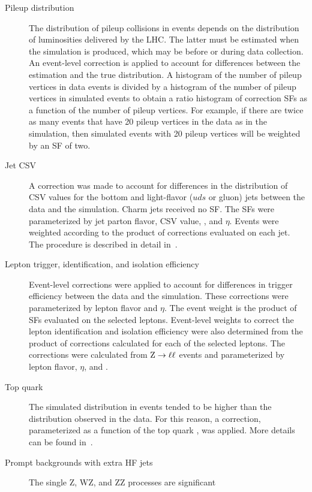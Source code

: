 \begin{description}
  \item[Pileup distribution] The distribution of pileup collisions in events
    depends on the distribution of luminosities delivered by the LHC. The latter must
    be estimated when the simulation is produced, which may be before or during
    data collection. An event-level correction is applied to account for differences
    between the estimation and the true distribution. A histogram of the number
    of pileup vertices in data events is divided by a histogram of the number of
    pileup vertices in simulated events to obtain a ratio histogram of
    correction SFs as a function of the number of pileup vertices. For example,
    if there are twice as many events that have 20 pileup vertices in the data
    as in the simulation, then simulated events with 20 pileup vertices will be
    weighted by an SF of two.
  \item[Jet CSV] A correction was made to account
    for differences in the distribution of CSV values for the bottom and
    light-flavor ($uds$ or gluon) jets between the data and the simulation.
    Charm jets received no SF. The SFs were parameterized by jet parton flavor,
    CSV value, \pT, and $\eta$. Events were weighted according to the product of
    corrections evaluated on each jet. The procedure is described in detail
    in~\cite{CMS-AN-2013-130}.
  \item[Lepton trigger, identification, and
    isolation efficiency] Event-level corrections were applied to account for
    differences in trigger efficiency between the data and the simulation. These
    corrections were
    parameterized by lepton flavor and $\eta$. The event weight is the product
    of SFs evaluated on the selected leptons. Event-level weights to correct the
    lepton identification and isolation efficiency were also determined from the
    product of corrections calculated for each of the selected leptons. The
    corrections were calculated from $\text{Z} \rightarrow \ell\ell$ events and
    parameterized by lepton flavor, $\eta$, and \pT.
  \item[Top quark \pT] The simulated \pT distribution in \ttbar events tended to
    be higher than the distribution observed in the data. For this reason, a correction,
    parameterized as a function of the top quark \pT, was applied. More details
    can be found in~\cite{Chatrchyan:2012saa}.
  \item[Prompt backgrounds with extra HF jets] The single Z, WZ, and ZZ
    processes are significant

\end{description}
